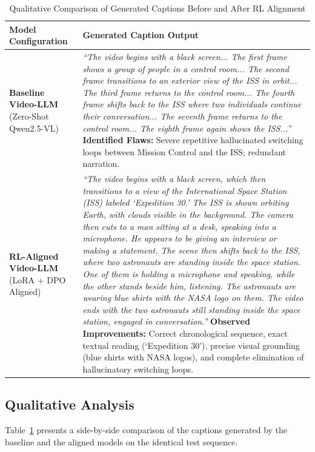 \documentclass[journal]{IEEEtai}
\begin{document}
\begin{table}[t]
\centering
\caption{Qualitative Comparison of Generated Captions Before and After RL Alignment}
\label{tab:qualitative}
\begin{tabular}{p{}p{}}
\toprule
\textbf{Model Configuration} & \textbf{Generated Caption Output} \\
\midrule
\textbf{Baseline Video-LLM} \newline (Zero-Shot Qwen2.5-VL) & \textit{``The video begins with a black screen... The first frame shows a group of people in a control room... The second frame transitions to an exterior view of the ISS in orbit... The third frame returns to the control room... The fourth frame shifts back to the ISS where two individuals continue their conversation... The seventh frame returns to the control room... The eighth frame again shows the ISS...''} \newline \textbf{Identified Flaws:} Severe repetitive hallucinated switching loops between Mission Control and the ISS; redundant narration. \\
\midrule
\textbf{RL-Aligned Video-LLM} \newline (LoRA + DPO Aligned) & \textit{``The video begins with a black screen, which then transitions to a view of the International Space Station (ISS) labeled `Expedition 30.' The ISS is shown orbiting Earth, with clouds visible in the background. The camera then cuts to a man sitting at a desk, speaking into a microphone. He appears to be giving an interview or making a statement. The scene then shifts back to the ISS, where two astronauts are standing inside the space station. One of them is holding a microphone and speaking, while the other stands beside him, listening. The astronauts are wearing blue shirts with the NASA logo on them. The video ends with the two astronauts still standing inside the space station, engaged in conversation.''} \newline \textbf{Observed Improvements:} Correct chronological sequence, exact textual reading (`Expedition 30'), precise visual grounding (blue shirts with NASA logos), and complete elimination of hallucinatory switching loops. \\
\bottomrule
\end{tabular}
\end{table}

\subsection{Qualitative Analysis}
Table~\ref{tab:qualitative} presents a side-by-side comparison of the captions generated by the baseline and the aligned models on the identical test sequence. 
\end{document}
